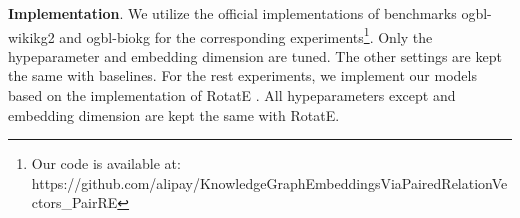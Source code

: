 \documentclass[11pt,a4paper]{article}
\begin{document}
\textbf{Implementation}.
We utilize the official implementations of benchmarks ogbl-wikikg2 and ogbl-biokg \cite{hu2020open} for the corresponding experiments\footnote{Our code is available at: \tiny{https://github.com/alipay/KnowledgeGraphEmbeddingsViaPairedRelationVectors\_PairRE}}.
Only the hypeparameter  and embedding dimension are tuned.
The other settings are kept the same with baselines.
For the rest experiments, we implement our models based on the implementation of RotatE \cite{sun2019rotate}.
All hypeparameters except  and embedding dimension are kept the same with RotatE.

\begin{table}[t]
\centering
{}
\caption{\label{table:sports_subrelation}  
The added subrelation rules for Sports dataset.}
\end{table}

\begin{table}[t]
\centering
{}
\caption{\label{table:sports_weight_tying} Link prediction results on Sports dataset.
Other results are taken from \cite{fatemi2019improved}.}
\end{table}
\end{document}
